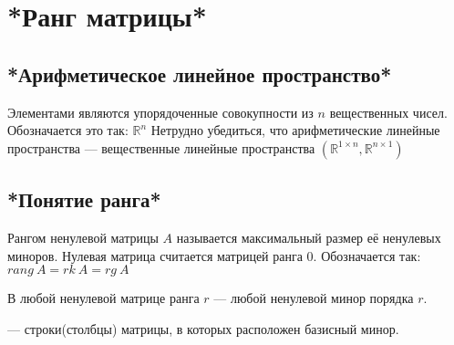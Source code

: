 \chapter{*Ранг матрицы*}
\section{*Арифметическое линейное пространство*}
\begin{opred}
Элементами  являются упорядоченные совокупности из $n$ вещественных чисел. Обозначается это так: $\mathbb{R}^n$ Нетрудно убедиться, что арифметические линейные пространства --- вещественные линейные пространства $(\mathbb{R}^{1\times{}n},\mathbb{R}^{n\times1})$
\end{opred}
\section{*Понятие ранга*}
\begin{opred}
Рангом ненулевой матрицы $A$ называется максимальный размер её ненулевых миноров. Нулевая матрица считается матрицей ранга 0. Обозначается так: $rang\ A=rk\ A=rg\ A$
\end{opred}
\begin{opred}
В любой ненулевой матрице ранга $r$  --- любой ненулевой минор порядка $r$.
\end{opred}
\begin{opred}
 --- строки(столбцы) матрицы, в которых расположен базисный минор.
\end{opred}
